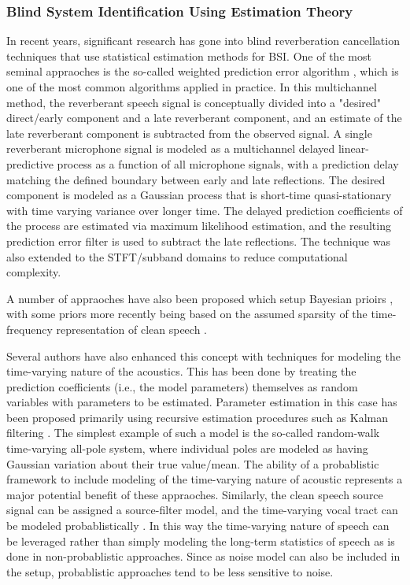 \subsubsection{Blind System Identification Using Estimation Theory}

In recent years, significant research has gone into blind reverberation cancellation techniques that use statistical estimation methods for BSI. One of the most seminal appraoches is the so-called weighted prediction error algorithm \citep[i.e., WPE ][]{nakatani2008blind, nakatani2010speech}, which is one of the most common algorithms applied in practice. In this multichannel method, the reverberant speech signal is conceptually divided into a "desired" direct/early component and a late reverberant component, and an estimate of the late reverberant component is subtracted from the observed signal. A single reverberant microphone signal is modeled as a multichannel delayed linear-predictive process as a function of all microphone signals, with a prediction delay matching the defined boundary between early and late reflections. The desired component is modeled as a Gaussian process that is short-time quasi-stationary with time varying variance over longer time. The delayed prediction coefficients of the process are estimated via maximum likelihood estimation, and the resulting prediction error filter is used to subtract the late reflections. The technique was also extended to the STFT/subband domains to reduce computational complexity.

A number of appraoches have also been proposed which setup Bayesian prioirs \citep[e.g., ][]{hopgood2005models}, with some priors more recently being based on the assumed sparsity of the time-frequency representation of clean speech \citep{jukic2015multi, jukic2016general}.

Several authors have also enhanced this concept with techniques for modeling the time-varying nature of the acoustics. This has been done by treating the prediction coefficients (i.e., the model parameters) themselves as random variables with parameters to be estimated. Parameter estimation in this case has been proposed primarily using recursive estimation procedures such as Kalman filtering \citep[e.g., ][]{braun2016online, schmid2014variational}. The simplest example of such a model is the so-called random-walk time-varying all-pole system, where individual poles are modeled as having Gaussian variation about their true value/mean. The ability of a probablistic framework to include modeling of the time-varying nature of acoustic represents a major potential benefit of these appraoches. Similarly, the clean speech source signal can be assigned a source-filter model, and the time-varying vocal tract can be modeled probablistically \citep{grenier2003time}. In this way the time-varying nature of speech can be leveraged rather than simply modeling the long-term statistics of speech as is done in non-probablistic approaches. Since as noise model can also be included in the setup, probablistic approaches tend to be less sensitive to noise.
 

